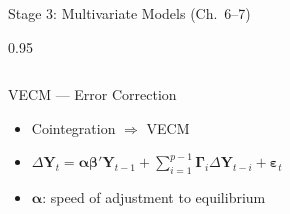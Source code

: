 \documentclass[9pt, aspectratio=169, t]{beamer}
\begin{document}
\begin{frame}{Stage 3: Multivariate Models (Ch.\ 6--7)}
\begin{cminipage}{0.95\textwidth}
{\begin{columns}[T]
            \vspace{0.05cm}

            \begin{block}{VECM --- Error Correction}
                \begin{itemize}\setlength{\itemsep}{0pt}
                    \item Cointegration $\Rightarrow$ VECM
                    \item $\Delta \mathbf{Y}_t = \boldsymbol{\alpha}\boldsymbol{\beta}'\mathbf{Y}_{t-1} + \sum_{i=1}^{p-1}\boldsymbol{\Gamma}_i\Delta\mathbf{Y}_{t-i} + \boldsymbol{\varepsilon}_t$
                    \item $\boldsymbol{\alpha}$: speed of adjustment to equilibrium
                \end{itemize}
            \end{block}
        \end{columns}
        }
    \end{cminipage}
\end{frame}
\end{document}
